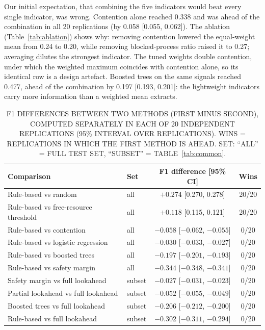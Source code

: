 \documentclass[conference]{IEEEtran}
\begin{document}
Our initial expectation, that combining the five indicators would beat every single indicator, was wrong. Contention alone reached 0.338 and was ahead of the combination in all 20 replications (by 0.058 [0.055, 0.062]). The ablation (Table~\ref{tab:ablation}) shows why: removing contention lowered the equal-weight mean from 0.24 to 0.20, while removing blocked-process ratio raised it to 0.27; averaging dilutes the strongest indicator. The tuned weights double contention, under which the weighted maximum coincides with contention alone, so its identical row is a design artefact. Boosted trees on the same signals reached 0.477, ahead of the combination by 0.197 [0.193, 0.201]: the lightweight indicators carry more information than a weighted mean extracts.

\begin{table}[t]
\centering\footnotesize
\caption{F1 DIFFERENCES BETWEEN TWO METHODS (FIRST MINUS SECOND), COMPUTED SEPARATELY IN EACH OF 20 INDEPENDENT REPLICATIONS (95\% INTERVAL OVER REPLICATIONS). WINS = REPLICATIONS IN WHICH THE FIRST METHOD IS AHEAD. SET: ``ALL'' = FULL TEST SET, ``SUBSET'' = TABLE~\ref{tab:common}.}
\label{tab:batches}
\setlength{\tabcolsep}{3pt}\begin{tabular}{>{\raggedright\arraybackslash}p{3.15cm}lcc}
\toprule
Comparison & Set & F1 difference [95\% CI] & Wins \\
\midrule
Rule-based vs random & all & $+0.274$ [0.270, 0.278] & 20/20 \\
Rule-based vs free-resource threshold & all & $+0.118$ [0.115, 0.121] & 20/20 \\
Rule-based vs contention & all & $-0.058$ [$-0.062$, $-0.055$] & 0/20 \\
Rule-based vs logistic regression & all & $-0.030$ [$-0.033$, $-0.027$] & 0/20 \\
Rule-based vs boosted trees & all & $-0.197$ [$-0.201$, $-0.193$] & 0/20 \\
Rule-based vs safety margin & all & $-0.344$ [$-0.348$, $-0.341$] & 0/20 \\
Safety margin vs full lookahead & subset & $-0.027$ [$-0.031$, $-0.023$] & 0/20 \\
Partial lookahead vs full lookahead & subset & $-0.052$ [$-0.055$, $-0.049$] & 0/20 \\
Boosted trees vs full lookahead & subset & $-0.206$ [$-0.212$, $-0.200$] & 0/20 \\
Rule-based vs full lookahead & subset & $-0.302$ [$-0.311$, $-0.294$] & 0/20 \\
\bottomrule
\end{tabular}
\end{table}
\end{document}
